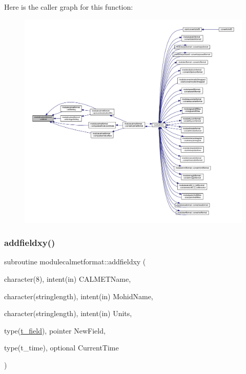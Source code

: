 Here is the caller graph for this function\+:\nopagebreak
\begin{figure}[H]
\begin{center}
\leavevmode
\includegraphics[width=350pt]{namespacemodulecalmetformat_ad719aec457312263662ee69e4ff227fb_icgraph}
\end{center}
\end{figure}
\mbox{\label{namespacemodulecalmetformat_a620b75749d8d431ee5f1c9152211ebb0}} 
\subsubsection{\texorpdfstring{addfieldxy()}{addfieldxy()}}
{\footnotesize\ttfamily subroutine modulecalmetformat\+::addfieldxy (\begin{DoxyParamCaption}\item[{character(8), intent(in)}]{C\+A\+L\+M\+E\+T\+Name,  }\item[{character(stringlength), intent(in)}]{Mohid\+Name,  }\item[{character(stringlength), intent(in)}]{Units,  }\item[{type(\mbox{\hyperlink{structmodulecalmetformat_1_1t__field}{t\+\_\+field}}), pointer}]{New\+Field,  }\item[{type(t\+\_\+time), optional}]{Current\+Time }\end{DoxyParamCaption})\hspace{0.3cm}{\ttfamily [private]}}

